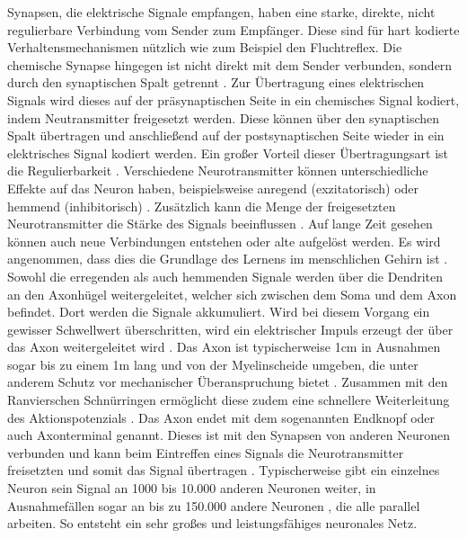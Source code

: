 Synapsen, die elektrische Signale empfangen, haben eine starke, direkte, nicht regulierbare Verbindung vom Sender zum Empfänger. Diese sind für hart kodierte Verhaltensmechanismen nützlich wie zum Beispiel den Fluchtreflex. Die chemische Synapse hingegen ist nicht direkt mit dem Sender verbunden, sondern durch den synaptischen Spalt getrennt \cite{kriesel2008kleiner}. Zur Übertragung eines elektrischen Signals wird dieses auf der präsynaptischen Seite in ein chemisches Signal kodiert, indem Neutransmitter freigesetzt werden. Diese können über den synaptischen Spalt übertragen und anschließend auf der postsynaptischen Seite wieder in ein elektrisches Signal kodiert werden. Ein großer Vorteil dieser Übertragungsart ist die Regulierbarkeit \cite{kriesel2008kleiner}. Verschiedene Neurotransmitter können unterschiedliche Effekte auf das Neuron haben, beispielsweise anregend (exzitatorisch) oder hemmend (inhibitorisch) \cite{kirschbaum2008biopsychologie}. Zusätzlich kann die Menge der freigesetzten Neurotransmitter die Stärke des Signals beeinflussen \cite{kriesel2008kleiner}. Auf lange Zeit gesehen können auch neue Verbindungen entstehen oder alte aufgelöst werden. Es wird angenommen, dass dies die Grundlage des Lernens im menschlichen Gehirn ist \cite{russell2013kunstliche}.\\
Sowohl die erregenden als auch hemmenden Signale werden über die Dendriten an den Axonhügel weitergeleitet, welcher sich zwischen dem Soma und dem Axon befindet. Dort werden die Signale akkumuliert. Wird bei diesem Vorgang ein gewisser Schwellwert überschritten, wird ein elektrischer Impuls erzeugt der über das Axon weitergeleitet wird \cite{kirschbaum2008biopsychologie}. Das Axon ist typischerweise 1cm in Ausnahmen sogar bis zu einem 1m lang und von der Myelinscheide umgeben, die unter anderem Schutz vor mechanischer Überanspruchung bietet \cite{russell2013kunstliche}. Zusammen mit den Ranvierschen Schnürringen  ermöglicht diese zudem eine schnellere Weiterleitung des Aktionspotenzials \cite{kirschbaum2008biopsychologie}. Das Axon endet mit dem sogenannten Endknopf oder auch Axonterminal genannt. Dieses ist mit den Synapsen von anderen Neuronen verbunden und kann beim Eintreffen eines Signals die Neurotransmitter freisetzten und somit das Signal übertragen \cite{kirschbaum2008biopsychologie}. Typischerweise gibt ein einzelnes Neuron sein Signal an 1000 bis 10.000 anderen Neuronen weiter, in Ausnahmefällen sogar an bis zu 150.000 andere Neuronen \cite{zell2003simulation}, die alle parallel arbeiten. So entsteht ein sehr großes und leistungsfähiges neuronales Netz. 

